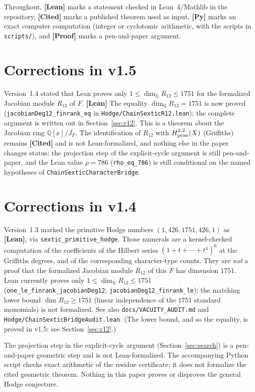 \documentclass[11pt]{amsart}
\theoremstyle{remark}\newtheorem{remark}[theorem]{Remark}
\newcommand{\Q}{\mathbb{Q}}\newcommand{\PP}{\mathbb{P}}
\begin{document}
Throughout, \textbf{[Lean]} marks a statement checked in Lean~4/Mathlib in the repository,
\textbf{[Cited]} marks a published theorem used as input, \textbf{[Py]} marks an exact computer computation (integer or cyclotomic arithmetic, with the
scripts in \texttt{scripts/}), and \textbf{[Proof]} marks a pen-and-paper argument.

\section{Corrections in v1.5}
Version~1.4 stated that Lean proves only $1\le\dim_{\Q}R_{12}\le 1751$ for the
formalized Jacobian module $R_{12}$ of $F$. \textbf{[Lean]} The equality
$\dim_{\Q}R_{12}=1751$ is now proved
(\texttt{jacobianDeg12\_finrank\_eq} in \texttt{Hodge/ChainSexticR12.lean}); the
complete argument is written out in Section~\ref{sec:r12}. This is a theorem about
the Jacobian ring $\Q[x]/J_F$. The identification of $R_{12}$ with
$H^{2,2}_{\rm prim}(X)$ (Griffiths) remains \textbf{[Cited]} and is not
Lean-formalized, and nothing else in the paper changes status: the projection step
of the explicit-cycle argument is still pen-and-paper, and the Lean value
$\rho=786$ (\texttt{rho\_eq\_786}) is still conditional on the named hypotheses of
\texttt{ChainSexticCharacterBridge}.

\section{Corrections in v1.4}
Version~1.3 marked the primitive Hodge numbers $(1,426,1751,426,1)$ as
\textbf{[Lean]}, via \texttt{sextic\_primitive\_hodge}. Those numerals are a
kernel-checked computation of the coefficients of the Hilbert series
$(1+t+\cdots+t^4)^6$ at the Griffiths degrees, and of the corresponding
character-type counts. They are \emph{not} a proof that the formalized
Jacobian module $R_{12}$ of this $F$ has dimension $1751$. Lean currently
proves only $1\le \dim_{\mathbb Q}R_{12}\le 1751$
(\texttt{one\_le\_finrank\_jacobianDeg12},
\texttt{jacobianDeg12\_finrank\_le}); the matching lower bound
$\dim R_{12}\ge 1751$ (linear independence of the $1751$ standard monomials)
is not formalized. See also \texttt{docs/VACUITY\_AUDIT.md} and
\texttt{Hodge/ChainSexticBridgeAudit.lean}. (The lower bound, and so the equality,
is proved in v1.5; see Section~\ref{sec:r12}.)

The projection step in the explicit-cycle argument
(Section~\ref{sec:search}) is a pen-and-paper geometric step and is not
Lean-formalized. The accompanying Python script checks exact arithmetic of
the residue certificate; it does not formalize the cited geometric theorem.
Nothing in this paper proves or disproves the general Hodge conjecture.
\end{document}
